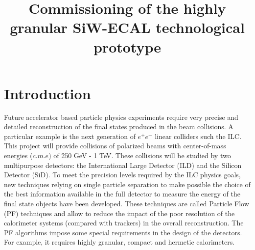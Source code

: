 \documentclass[a4paper,11pt]{article}
\title{\boldmath Commissioning of the highly granular SiW-ECAL technological prototype}
\begin{document}
\maketitle
\flushbottom


\section{Introduction}

Future accelerator based particle physics experiments
require very precise and detailed reconstruction of the final states produced
in the beam collisions. A particular example is the next generation of $e^{+}e^{-}$
linear colliders such the ILC\cite{Behnke:2013xla,Baer:2013cma,Adolphsen:2013jya,Adolphsen:2013kya,Behnke:2013lya}.
This project will provide collisions of polarized beams with center-of-mass energies ($c.m.e$) of 250 GeV - 1 TeV.
These collisions will be studied by two multipurpose detectors:
the International Large Detector (ILD) and the Silicon Detector (SiD)\cite{Behnke:2013lya}.
To meet the precision levels required by the ILC %
physics goals,
new techniques relying on single particle separation to make possible the choice of the best information available
in the full detector to measure the energy of the final state objects have been developed.
These techniques are called Particle Flow (PF) techniques \cite{Brient:2002gh,Morgunov:2004ed,Sefkow:2015hna}
and allow to reduce the impact of the poor resolution of the calorimeter systems (compared with trackers) in the overall reconstruction.
The PF algorithms impose some special requirements in the design of the detectors.
For example, it requires highly granular, compact
and hermetic calorimeters.
\end{document}
